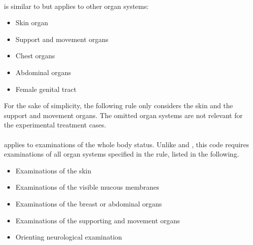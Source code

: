 \paragraph{}
 is similar to  but applies to other organ systems:
\begin{itemize}
    \item Skin organ
    \item Support and movement organs
    \item Chest organs
    \item Abdominal organs
    \item Female genital tract
\end{itemize}
For the sake of simplicity, the following rule only considers the skin and the support and movement organs.
The omitted organ systems are not relevant for the experimental treatment cases.


\paragraph{}
 applies to examinations of the whole body status.
Unlike  and , this code requires examinations of all organ systems specified in the rule, listed in the following.
\begin{itemize}
    \item Examinations of the skin
    \item Examinations of the visible mucous membranes
    \item Examinations of the breast or abdominal organs
    \item Examinations of the supporting and movement organs
    \item Orienting neurological examination
\end{itemize}


